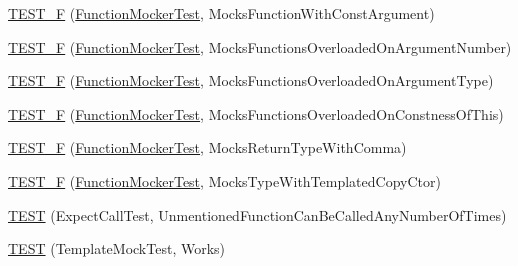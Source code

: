 \begin{DoxyCompactItemize}
\item 
\mbox{\hyperlink{namespacetesting_1_1gmock__generated__function__mockers__test_a957ee1afed65097f1c25790f266ec91e}{T\+E\+S\+T\+\_\+F}} (\mbox{\hyperlink{classtesting_1_1gmock__generated__function__mockers__test_1_1_function_mocker_test}{Function\+Mocker\+Test}}, Mocks\+Function\+With\+Const\+Argument)
\item 
\mbox{\hyperlink{namespacetesting_1_1gmock__generated__function__mockers__test_a23b4f6d7bf9f6b35126ee137aa48ae3b}{T\+E\+S\+T\+\_\+F}} (\mbox{\hyperlink{classtesting_1_1gmock__generated__function__mockers__test_1_1_function_mocker_test}{Function\+Mocker\+Test}}, Mocks\+Functions\+Overloaded\+On\+Argument\+Number)
\item 
\mbox{\hyperlink{namespacetesting_1_1gmock__generated__function__mockers__test_a6fb9a5901e2d2066a9fe5a3d05c0cbe1}{T\+E\+S\+T\+\_\+F}} (\mbox{\hyperlink{classtesting_1_1gmock__generated__function__mockers__test_1_1_function_mocker_test}{Function\+Mocker\+Test}}, Mocks\+Functions\+Overloaded\+On\+Argument\+Type)
\item 
\mbox{\hyperlink{namespacetesting_1_1gmock__generated__function__mockers__test_ad580a4b2f97b3c2643794a627b347511}{T\+E\+S\+T\+\_\+F}} (\mbox{\hyperlink{classtesting_1_1gmock__generated__function__mockers__test_1_1_function_mocker_test}{Function\+Mocker\+Test}}, Mocks\+Functions\+Overloaded\+On\+Constness\+Of\+This)
\item 
\mbox{\hyperlink{namespacetesting_1_1gmock__generated__function__mockers__test_abb74ac8e211661c0d87c902f87002e6d}{T\+E\+S\+T\+\_\+F}} (\mbox{\hyperlink{classtesting_1_1gmock__generated__function__mockers__test_1_1_function_mocker_test}{Function\+Mocker\+Test}}, Mocks\+Return\+Type\+With\+Comma)
\item 
\mbox{\hyperlink{namespacetesting_1_1gmock__generated__function__mockers__test_aa2f918da5d179b4ef678cb803456c7d3}{T\+E\+S\+T\+\_\+F}} (\mbox{\hyperlink{classtesting_1_1gmock__generated__function__mockers__test_1_1_function_mocker_test}{Function\+Mocker\+Test}}, Mocks\+Type\+With\+Templated\+Copy\+Ctor)
\item 
\mbox{\hyperlink{namespacetesting_1_1gmock__generated__function__mockers__test_ae0d5aa8e715f3c183f1ccdcf390187e7}{T\+E\+ST}} (Expect\+Call\+Test, Unmentioned\+Function\+Can\+Be\+Called\+Any\+Number\+Of\+Times)
\item 
\mbox{\hyperlink{namespacetesting_1_1gmock__generated__function__mockers__test_a5f59a7b507101fc0dbb558c090974f02}{T\+E\+ST}} (Template\+Mock\+Test, Works)
\item 

\end{DoxyCompactItemize}
